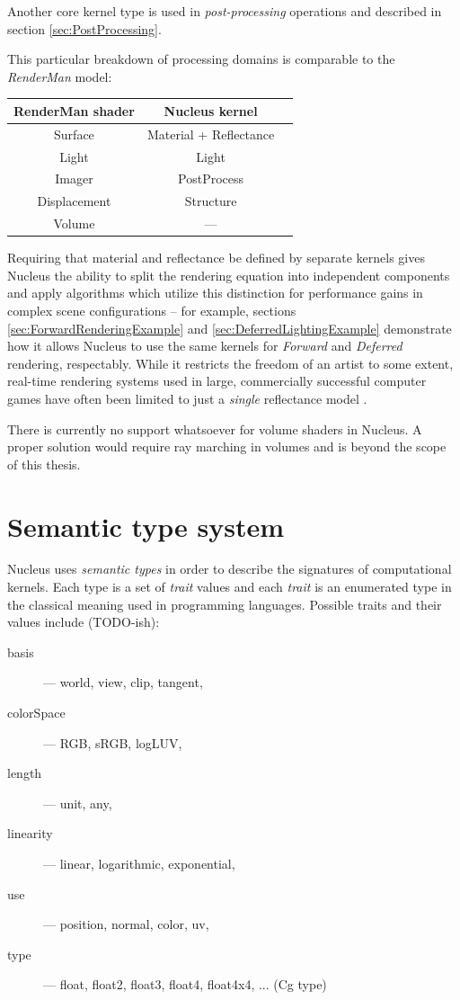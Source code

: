 Another core kernel type is used in \emph{post-processing} operations and described in section \ref{sec:PostProcessing}.

This particular breakdown of processing domains is comparable to the \emph{RenderMan} model:

\begin{center}
\begin{tabular}{ | c | c | c | }
\hline
RenderMan shader & Nucleus kernel \\
\hline
Surface & Material + Reflectance \\
Light & Light \\
Imager & PostProcess \\
Displacement & Structure \\
Volume & --- \\
\hline
\end{tabular}
\end{center}

Requiring that material and reflectance be defined by separate kernels gives Nucleus the ability to split the rendering equation into independent components and apply algorithms which utilize this distinction for performance gains in complex scene configurations -- for example, sections \ref{sec:ForwardRenderingExample} and \ref{sec:DeferredLightingExample} demonstrate how it allows Nucleus to use the same kernels for \emph{Forward} and \emph{Deferred} rendering, respectably. While it restricts the freedom of an artist to some extent, real-time rendering systems used in large, commercially successful computer games have often been limited to just a \emph{single} reflectance model \cite{CryEngine3Deferred, Killzone2Deferred}.

There is currently no support whatsoever for volume shaders in Nucleus. A proper solution would require ray marching in volumes and is beyond the scope of this thesis.

\section{Semantic type system}

Nucleus uses \emph{semantic types} in order to describe the signatures of computational kernels. Each type is a set of \emph{trait} values and each \emph{trait} is an enumerated type in the classical meaning used in programming languages. Possible traits and their values include (TODO-ish):
\begin{description}
\item[basis] --- world, view, clip, tangent,
\item[colorSpace] --- RGB, sRGB, logLUV,
\item[length] --- unit, any,
\item[linearity] --- linear, logarithmic, exponential,
\item[use] --- position, normal, color, uv,
\item[type] --- float, float2, float3, float4, float4x4, ... (Cg type)
\end{description}

